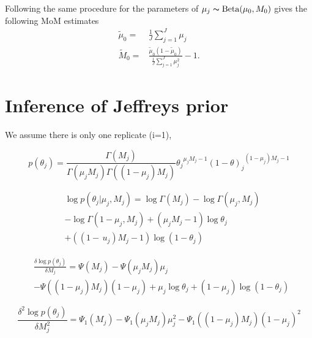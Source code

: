 \documentclass[11pt,reqno]{amsart}
\begin{document}
Following the same procedure for the parameters of $\mu_j \thicksim \text{Beta}(\mu_0, M_0)$ gives the following MoM estimates
\begin{eqnarray}
	\tilde{\mu}_0 =& \frac{1}{J} \sum_{j=1}^J \mu_j \\
	\tilde{M}_0 =& \frac{ \tilde{\mu}_0 (1 - \tilde{\mu}_0 ) } {\frac{1}{J} \sum_{j=1}^J \mu_j^2 } -1.
\end{eqnarray}

\section{Inference of Jeffreys prior}\label{sec:appendix_Jeffreys}
We assume there is only one replicate (i=1),

\begin{equation}\label{eqn:Betapdf}
p\left({\theta }_{j} \right)= \frac{\Gamma \left({M}_{j} \right)}{\Gamma \left({\mu }_{j} {M}_{j}\right)\Gamma \left(( 1-{\mu }_{j}){M}_{j}\right)} {{\theta}_{j}}^{{\mu}_{j}{M}_{j}-1}{\left(1-\theta\right)_{j}}^{\left(1-{\mu}_{j}\right){M}_{j}-1}
\end{equation}

\begin{equation}\label{equ:JefferyInference1}
\begin{split}
&\log p\left(\theta_{j}|\mu_{j},M_{j}\right) =\log \Gamma \left(M_{j}\right)-\log \Gamma\left(\mu_{j},M_{j}\right)\\
&- \log \Gamma\left(1-\mu_{j},M_{j}\right) + (\mu_{j}M_{j}-1)\log\theta_{j}\\
& + ((1-\,u_{j})M_{j}-1)\log(1-\theta_{j})\
\end{split}
\end{equation}

\begin{equation}
\begin{split}
&\frac{\delta\log p(\theta_{j})}{\delta M_{j}} =\Psi(M_{j}) - \Psi(\mu_{j} M_{j})\mu_{j}\\
&- \Psi((1-\mu_{j})M_{j})(1-\mu_{j}) +\mu_{j}\log\theta_{j} + (1-\mu_{j})\log(1-\theta_{j})\
\end{split}
\end{equation}

\begin{equation}
\frac{\delta^{2}\log p(\theta_{j})}{\delta M_{j}^{2}}  = \Psi_{1}(M_{j}) - \Psi_{1}(\mu_{j} M_{j})\mu_{j}^{2} - \Psi_{1}((1-\mu_{j})M_{j})(1-\mu_{j})^{2}
\end{equation}
\end{document}
